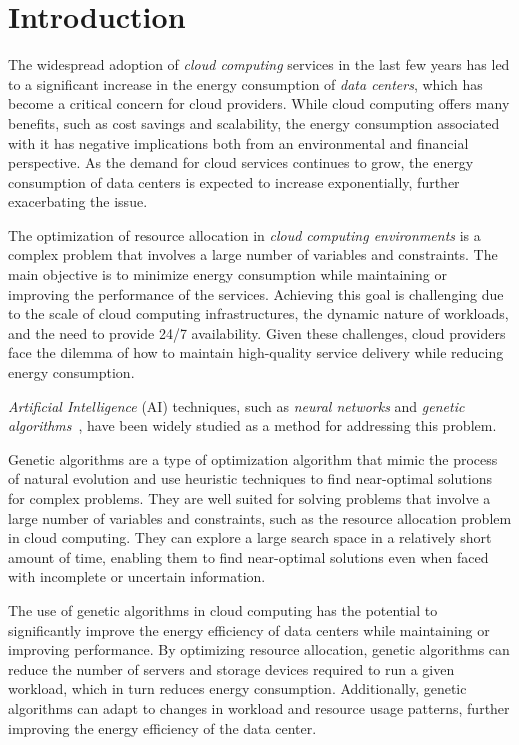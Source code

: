 \section{Introduction}\label{sect:intro}

The widespread adoption of \textit{cloud computing} services in the last few years has led to a significant increase in the energy consumption 
of \textit{data centers}, which has become a critical concern for cloud providers. 
While cloud computing offers many benefits, such as cost savings and scalability, 
the energy consumption associated with it has negative implications both from an environmental and financial perspective. 
As the demand for cloud services continues to grow, the energy consumption of data centers is expected to increase exponentially, 
further exacerbating the issue.

The optimization of resource allocation in \textit{cloud computing environments} is a complex problem that involves a large number of variables and constraints. 
The main objective is to minimize energy consumption while maintaining or improving the performance of the services. 
Achieving this goal is challenging due to the scale of cloud computing infrastructures, the dynamic nature of workloads, and the need to provide 24/7 availability. 
Given these challenges, cloud providers face the dilemma of how to maintain high-quality service delivery while reducing energy consumption.~\cite{yusoh2012composite}

\textit{Artificial Intelligence} (AI) techniques, such as \textit{neural networks} and \textit{genetic algorithms}~\cite{mitchell1998introduction, yusoh2012composite, rafique2011cloud, nzanywayingoma2017effective}, 
have been widely studied as a method for addressing this problem. 

Genetic algorithms are a type of optimization algorithm that mimic the process of natural evolution and use heuristic techniques to find near-optimal solutions 
for complex problems. They are well suited for solving problems that involve a large number of variables and constraints, 
such as the resource allocation problem in cloud computing. 
They can explore a large search space in a relatively short amount of time, enabling them to find near-optimal solutions even 
when faced with incomplete or uncertain information.~\cite{forrest1996genetic}

The use of genetic algorithms in cloud computing has the potential to significantly improve the energy efficiency of data centers while maintaining or improving performance. 
By optimizing resource allocation, genetic algorithms can reduce the number of servers and storage devices required to run a given workload, 
which in turn reduces energy consumption. Additionally, genetic algorithms can adapt to changes in workload and resource usage patterns, 
further improving the energy efficiency of the data center.

